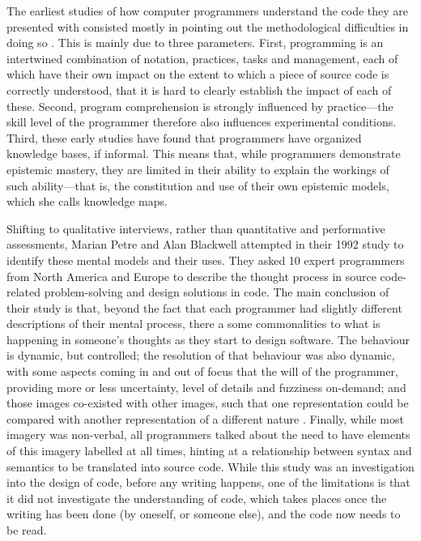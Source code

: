 The earliest studies of how computer programmers understand the code they are presented with consisted mostly in pointing out the methodological difficulties in doing so \citep{sheil_psychological_1981,shneiderman_measuring_1977}. This is mainly due to three parameters. First, programming is an intertwined combination of notation, practices, tasks and management, each of which have their own impact on the extent to which a piece of source code is correctly understood, that it is hard to clearly establish the impact of each of these. Second, program comprehension is strongly influenced by practice—the skill level of the programmer therefore also influences experimental conditions. Third, these early studies have found that programmers have organized knowledge bases, if informal. This means that, while programmers demonstrate epistemic mastery, they are limited in their ability to explain the workings of such ability—that is, the constitution and use of their own epistemic models, which she calls knowledge maps.

Shifting to qualitative interviews, rather than quantitative and performative assessments, Marian Petre and Alan Blackwell attempted in their 1992 study to identify these mental models and their uses. They asked 10 expert programmers from North America and Europe to describe the thought process in source code-related problem-solving and design solutions in code. The main conclusion of their study is that, beyond the fact that each programmer had slightly different descriptions of their mental process, there a some commonalities to what is happening in someone's thoughts as they start to design software. The behaviour is dynamic, but controlled; the resolution of that behaviour was also dynamic, with some aspects coming in and out of focus that the will of the programmer, providing more or less uncertainty, level of details and fuzziness on-demand; and those images co-existed with other images, such that one representation could be compared with another representation of a different nature \citep{petre_glimpse_1997}. Finally, while most imagery was non-verbal, all programmers talked about the need to have elements of this imagery labelled at all times, hinting at a relationship between syntax and semantics to be translated into source code. While this study was an investigation into the design of code, before any writing happens, one of the limitations is that it did not investigate the understanding of code, which takes places once the writing has been done (by oneself, or someone else), and the code now needs to be read.

